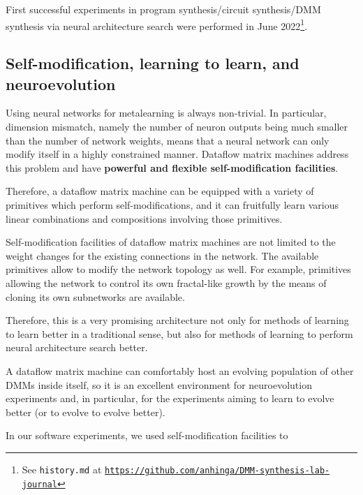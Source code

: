 \documentclass{article}
\begin{document}
First successful experiments in program synthesis/circuit synthesis/DMM synthesis via neural architecture search
were performed in June 2022\footnote{See {\tt history.md} at
\href{https://github.com/anhinga/DMM-synthesis-lab-journal}{\tt https://github.com/anhinga/DMM-synthesis-lab-journal}}.

\subsection{Self-modification, learning to learn, and neuroevolution} \label{sec:selfref}

Using neural networks for metalearning
is always non-trivial. In particular, dimension mismatch, namely the number of neuron outputs 
being much smaller than the number of network weights,
means that a neural network
can only modify itself in a highly constrained manner. Dataflow matrix machines address
this problem and have {\bf powerful and flexible self-modification facilities}.

Therefore, a dataflow matrix machine can be equipped with a variety of primitives
which perform self-modifications, and it can fruitfully learn various linear combinations and
compositions involving those primitives.

Self-modification facilities of dataflow matrix machines are not limited to the weight
changes for the existing connections in the network. The available primitives allow to
modify the network topology as well. For example, primitives allowing the network
to control its own fractal-like growth by the means of cloning its own subnetworks
are available.

Therefore, this is a very promising architecture not only for methods of learning to learn
better in a traditional sense, but also for methods of learning to perform
neural architecture search better. 

A dataflow matrix machine can comfortably host
an evolving population of other DMMs inside itself, so it is
an excellent environment for neuroevolution experiments and, in particular,
for the experiments aiming to learn to evolve better (or to evolve to evolve better).

\vspace{0.1in}
\noindent
In our software experiments, we used self-modification facilities to
\end{document}
